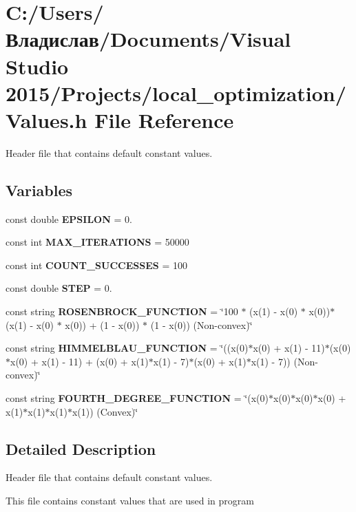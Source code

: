 \section{C\+:/\+Users/Владислав/\+Documents/\+Visual Studio 2015/\+Projects/local\+\_\+optimization/\+Values.h File Reference}
\label{_values_8h}


Header file that contains default constant values.  


\subsection*{Variables}
\begin{DoxyCompactItemize}
\item 
\mbox{\label{_values_8h_a596344e5a2992d2beec43b76a6294de0}} 
const double {\bfseries E\+P\+S\+I\+L\+ON} = 0.
\item 
\mbox{\label{_values_8h_ac398e4bea943a72137f06ff1146e65b7}} 
const int {\bfseries M\+A\+X\+\_\+\+I\+T\+E\+R\+A\+T\+I\+O\+NS} = 50000
\item 
\mbox{\label{_values_8h_a5b739a927874790745d45a63f7fc8fa4}} 
const int {\bfseries C\+O\+U\+N\+T\+\_\+\+S\+U\+C\+C\+E\+S\+S\+ES} = 100
\item 
\mbox{\label{_values_8h_a2ce13072b971784cb5bce4712cff4c3d}} 
const double {\bfseries S\+T\+EP} = 0.
\item 
\mbox{\label{_values_8h_acd9d397749ce2ed992cc4ee45108475f}} 
const string {\bfseries R\+O\+S\+E\+N\+B\+R\+O\+C\+K\+\_\+\+F\+U\+N\+C\+T\+I\+ON} = \char`\"{}100 $\ast$ (x(1) -\/ x(0) $\ast$ x(0))$\ast$(x(1) -\/ x(0) $\ast$ x(0)) + (1 -\/ x(0)) $\ast$ (1 -\/ x(0)) (Non-\/convex)\char`\"{}
\item 
\mbox{\label{_values_8h_adc4aeb3ae8f2805ba8ab966847e2a94b}} 
const string {\bfseries H\+I\+M\+M\+E\+L\+B\+L\+A\+U\+\_\+\+F\+U\+N\+C\+T\+I\+ON} = \char`\"{}((x(0)$\ast$x(0) + x(1) -\/ 11)$\ast$(x(0)$\ast$x(0) + x(1) -\/ 11) + (x(0) + x(1)$\ast$x(1) -\/ 7)$\ast$(x(0) + x(1)$\ast$x(1) -\/ 7)) (Non-\/convex)\char`\"{}
\item 
\mbox{\label{_values_8h_a067b30858917621cd28972c4517967af}} 
const string {\bfseries F\+O\+U\+R\+T\+H\+\_\+\+D\+E\+G\+R\+E\+E\+\_\+\+F\+U\+N\+C\+T\+I\+ON} = \char`\"{}(x(0)$\ast$x(0)$\ast$x(0)$\ast$x(0) + x(1)$\ast$x(1)$\ast$x(1)$\ast$x(1)) (Convex)\char`\"{}
\end{DoxyCompactItemize}


\subsection{Detailed Description}
Header file that contains default constant values. 

This file contains constant values that are used in program 